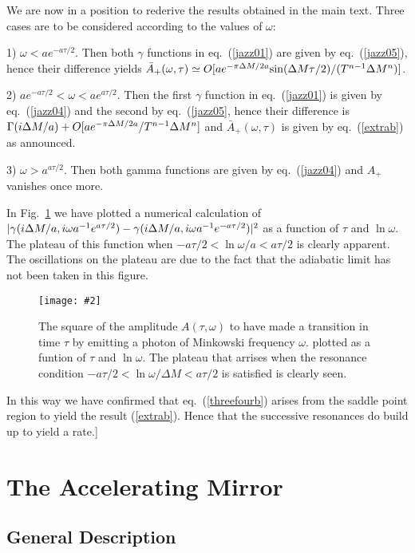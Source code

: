 \documentclass[12pt,oneside]{report}
\newcommand{\dessin}[4]
{\begin{figure}[tp]\begin{center}
\texttt{[image: \#2]}%
\end{center}
\caption{#4}
\label{#3}
\end{figure}}
\begin{document}
We are now
in a position to rederive  the results obtained in the main
text. Three cases are to be considered according to the
values of $\omega$:

1) $\omega < a e^{- a \tau / 2} $. Then both $\gamma$
functions in eq.~(\ref{jazz01}) are given by eq.~(\ref{jazz05}),
hence their difference yields  $\bar A_+ (\omega, \tau)
\simeq O[a e^{-\pi \Delta M/2a} {\rm sin} (\Delta M \tau / 2) / (T^{n-1}\Delta
M^n)]$.

2) $a e^{- a \tau / 2}  < \omega < a e^{a \tau / 2} $.
Then the first $\gamma$ function in eq.~(\ref{jazz01}) is given
by eq.~(\ref{jazz04}) and the second by eq.~(\ref{jazz05}, hence
their difference is $\Gamma(i \Delta M /a) +  O[a\/e^{-\pi \Delta M/2a}/T^{n-1}
\Delta M^n]$
and $\bar A_+(\omega , \tau)$ is given by eq.~(\ref{extrab}) as announced.

3) $\omega > a^{a\tau / 2}$. Then both gamma functions are
given by eq.~(\ref{jazz04}) and $A_+$ vanishes once more.

In Fig.~\ref{rate} we have plotted a numerical calculation of
$\vert \gamma(i\Delta M /a , i \omega a^{-1} e^{a
\tau/2} ) \break
-\gamma(i\Delta M /a , i \omega a^{-1} e^{-a
\tau/2} ) \vert^2$ as a function of $\tau$ and $\ln
\omega$. The plateau of this function when 
$-a \tau/ 2 < \ln \omega /a < a \tau /2$ is clearly
apparent. The oscillations on the plateau are due to the fact that the
adiabatic limit has not been taken  in
this figure. 

\dessin{1.000}{NFIG2-2.eps}{rate}{The square of the amplitude $A(\tau , \omega)$ to
have made a transition in time $\tau$ by emitting a photon of
Minkowski frequency $\omega$. plotted as a funtion of
$\tau$ and $\ln \omega$.  The plateau that arrises when
the resonance condition $-a\tau/2 < \ln \omega/\Delta M <
a \tau/2$ is satisfied is clearly seen.
} 

In this way we have confirmed that 
eq.~(\ref{threefourb}) arises from the saddle point region to
yield the result (\ref{extrab}). Hence that the successive
resonances do build up to yield a rate.]





\section{The Accelerating Mirror}\label{mirro}

\subsection{General Description}
\end{document}
